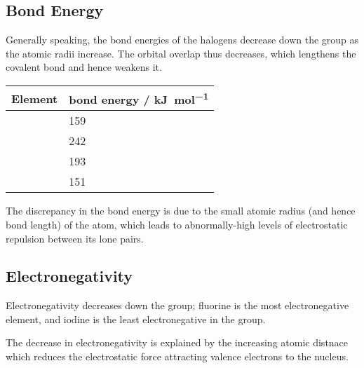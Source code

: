 

		\subsection{Bond Energy}

			Generally speaking, the bond energies of the halogens decrease down the group as the atomic radii increase. The orbital overlap
			thus decreases, which lengthens the covalent bond and hence weakens it.

			\begin{table}[htb]\renewcommand{\arraystretch}{1.5}\begin{center}
			\begin{tabu} to 0.6\textwidth {X[c,m] | X[c,m]}

				Element     &   bond energy / \si{\kilo\joule\per\mole} \\  \hline
				      &   \num{159}                               \\
				\ch{\Cl}    &   \num{242}                               \\
				     &   \num{193}                               \\
				      &   \num{151}                               \\

			\end{tabu}\end{center}
			\end{table}\vspace{-1em}

			The discrepancy in the  bond energy is due to the small atomic radius (and hence bond length) of the  atom,
			which leads to abnormally-high levels of electrostatic repulsion between its lone pairs.



		\subsection{Electronegativity}

			Electronegativity decreases down the group; fluorine is the most electronegative element, and iodine is the least
			electronegative in the group.

			The decrease in electronegativity is explained by the increasing atomic distnace which reduces the electrostatic force
			attracting valence electrons to the nucleus.




